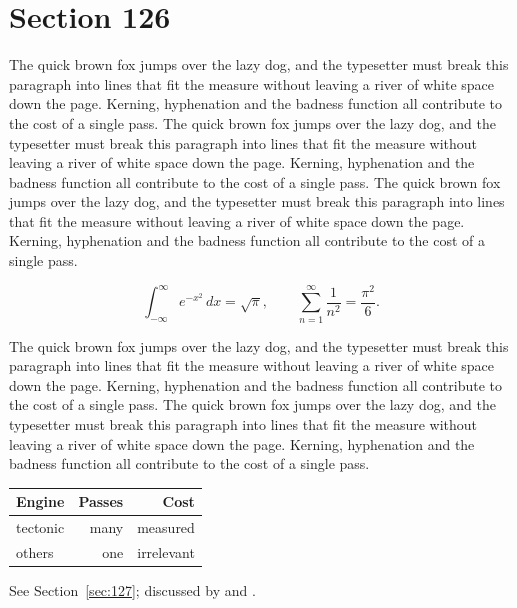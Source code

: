 \documentclass{article}
\begin{document}
\section{Section 126}
\label{sec:126}
The quick brown fox jumps over the lazy dog, and the typesetter must break this paragraph into lines that fit the measure without leaving a river of white space down the page. Kerning, hyphenation and the badness function all contribute to the cost of a single pass. The quick brown fox jumps over the lazy dog, and the typesetter must break this paragraph into lines that fit the measure without leaving a river of white space down the page. Kerning, hyphenation and the badness function all contribute to the cost of a single pass. The quick brown fox jumps over the lazy dog, and the typesetter must break this paragraph into lines that fit the measure without leaving a river of white space down the page. Kerning, hyphenation and the badness function all contribute to the cost of a single pass. 

\begin{equation}\label{eq:126}
\int_{-\infty}^{\infty} e^{-x^{2}}\,dx = \sqrt{\pi}, \qquad
\sum_{n=1}^{\infty} \frac{1}{n^{2}} = \frac{\pi^{2}}{6}.
\end{equation}

The quick brown fox jumps over the lazy dog, and the typesetter must break this paragraph into lines that fit the measure without leaving a river of white space down the page. Kerning, hyphenation and the badness function all contribute to the cost of a single pass. The quick brown fox jumps over the lazy dog, and the typesetter must break this paragraph into lines that fit the measure without leaving a river of white space down the page. Kerning, hyphenation and the badness function all contribute to the cost of a single pass. 

\begin{center}
\begin{tabular}{lrr}
\toprule
Engine & Passes & Cost \\
\midrule
tectonic & many & measured \\
others & one & irrelevant \\
\bottomrule
\end{tabular}
\end{center}

See Section~\ref{sec:127}; discussed by \textcite{k2} and \textcite{l4}.
\end{document}
